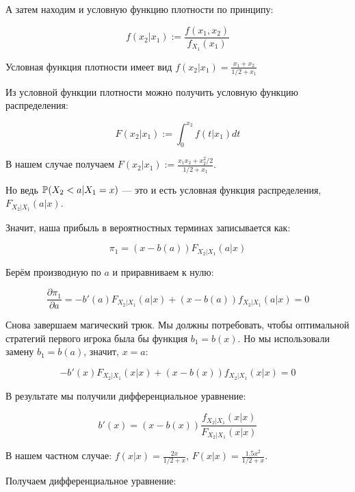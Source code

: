 \begin{enumerate}
А затем находим и условную функцию плотности по принципу:

\begin{equation}
f(x_{2}|x_{1}):=\frac{f(x_{1},x_{2})}{f_{X_{1}}(x_{1})}
\end{equation}

Условная функция плотности имеет вид $ f(x_{2}|x_{1})=\frac{x_{1}+x_{2}}{1/2+x_{1}} $

Из условной функции плотности можно получить условную функцию распределения:

\begin{equation}
F(x_{2}|x_{1}):=\int_{0}^{x_{2}} f(t|x_{1}) dt
\end{equation}

В нашем случае получаем $F(x_{2}|x_{1}):=\frac{x_{1}x_{2}+x_{2}^{2}/2}{1/2+x_{1}}$.

Но ведь $ \P(X_{2}<a|X_{1}=x) $ — это и есть условная функция распределения, $ F_{X_{2}|X_{1}}(a|x) $.

Значит, наша прибыль в вероятностных терминах записывается как:

\begin{equation}
\pi_{1}=(x-b(a)) F_{X_{2}|X_{1}}(a|x)
\end{equation}

Берём производную по $ a $ и приравниваем к нулю:

\begin{equation}
\frac{\partial \pi_{1}}{\partial a}=-b'(a) F_{X_{2}|X_{1}}(a|x)+(x-b(a))f_{X_{2}|X_{1}}(a|x)=0
\end{equation}

Снова завершаем магический трюк. Мы должны потребовать, чтобы оптимальной стратегий первого игрока была бы функция $b_{1}=b(x)$. Но мы использовали замену $ b_{1}=b(a) $, значит, $ x=a $:


\begin{equation}
-b'(x) F_{X_{2}|X_{1}}(x|x)+(x-b(x))f_{X_{2}|X_{1}}(x|x)=0
\end{equation}

В результате мы получили дифференциальное уравнение:

\begin{equation}
b'(x)=(x-b(x))\frac{f_{X_{2}|X_{1}}(x|x)}{F_{X_{2}|X_{1}}(x|x)}
\end{equation}

В нашем частном случае: $ f(x|x)=\frac{2x}{1/2+x} $, $ F(x|x)=\frac{1.5x^2}{1/2+x} $.

Получаем дифференциальное уравнение:


\end{enumerate}
